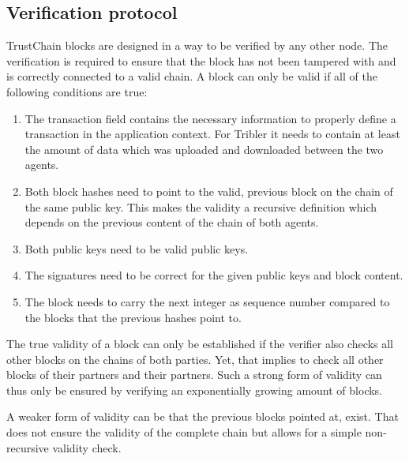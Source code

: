 \subsection{Verification protocol}
\label{sec:validation}
TrustChain blocks are designed in a way to be verified by any other node. The verification is 
required to ensure that the block has not been tampered with and is correctly connected to a valid 
chain. A block can only be valid if all of the following conditions are true:

\begin{enumerate}
    \item The transaction field contains the necessary information to properly define a transaction 
    in the application context. For Tribler it needs to contain at least the amount of data which 
    was uploaded and downloaded between the two agents. 
    \item Both block hashes need to point to the valid, previous block on the chain of the same 
    public key. This makes the validity a recursive definition which depends on the previous content
    of the chain of both agents.
    \item Both public keys need to be valid public keys.
    \item The signatures need to be correct for the given public keys and block content.
    \item The block needs to carry the next integer as sequence number compared to the blocks that 
    the previous hashes point to.
\end{enumerate}

The true validity of a block can only be established if the verifier also checks all other blocks on
the chains of both parties. Yet, that implies to check all other blocks of their partners and their
partners. Such a strong form of validity can thus only be ensured by verifying an exponentially 
growing amount of blocks.

A weaker form of validity can be that the previous blocks pointed at, exist. That does not ensure 
the validity of the complete chain but allows for a simple non-recursive validity check.

